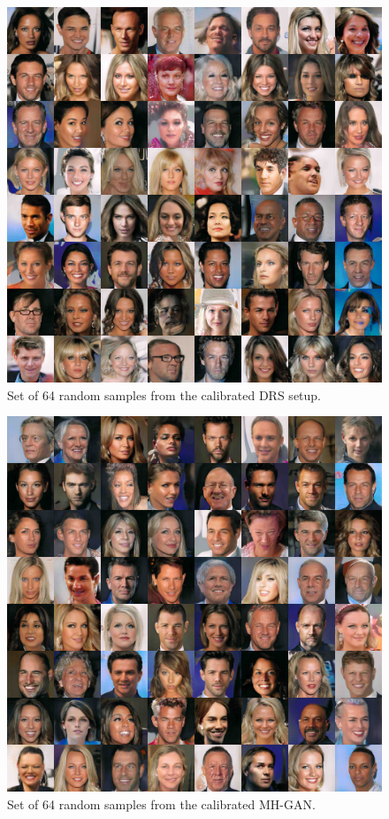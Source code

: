 \begin{figure}[htbp]
    \centering
    \includegraphics[width=\exfactor\textwidth]{figures/pgan/all_base_iso_reject_lq.jpg}
    \caption{
    Set of 64 random samples from the calibrated DRS setup.
    }
    \label{fig:DRS 64x}
\end{figure}

\begin{figure}[htbp]
    \centering
    \includegraphics[width=\exfactor\textwidth]{figures/pgan/all_base_iso_MH_lq.jpg}
    \caption{
    Set of 64 random samples from the calibrated MH-GAN\@.
    }
    \label{fig:MHGAN 64x}
\end{figure}



